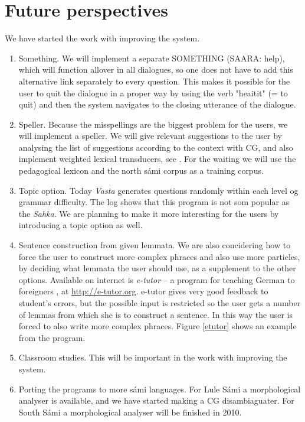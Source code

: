 \documentclass[11pt]{article}
\begin{document}
\section{Future perspectives}
We have started the work with improving the system.
\begin{enumerate}
\item Something. We will implement a separate SOMETHING (SAARA: help), which will function allover in all dialogues, so one does not have to add this alternative link separately to every question. This makes it possible for the user to quit the dialogue in a proper way by using the verb "heaitit" (= to quit) and then the system navigates to the closing utterance of the dialogue. 
\item Speller. Because the misspellings are the biggest problem for the users, we will implement a speller. We will give relevant suggestions to the user by analysing the list of suggestions according to the context with CG, and also implement weighted lexical transducers, see \cite{Linden:09}. For the waiting we will use the pedagogical lexicon and the north sámi corpus as a training corpus.
\item Topic option. Today \textit{Vasta} generates questions randomly within each level og grammar difficulty. The log shows that this program is not som popular as the \textit{Sahka}. We are planning to make it more interesting for the users by introducing a topic option as well.
\item Sentence construction from given lemmata. We are also concidering how to force the user to construct more complex phraces and also use more particles, by deciding what lemmata the user should use, as a supplement to the other options. Available on internet is \textit{e-tutor} -- a program for teaching German to foreigners \cite{Heift:01,Heift:02}, at \url{http://e-tutor.org}. e-tutor gives very good feedback to student's errors, but the possible input is restricted so the user gets a number of lemmas from which she is to construct a sentence. In this way the user is forced to also write more complex phraces. Figure \ref{etutor} shows an example from the program.
\item Classroom studies. This will be important in the work with improving the system.
\item Porting the programs to more sámi languages. For Lule Sámi a morphological analyser is available, and we have started making a CG disambiaguater. For South Sámi a morphological analyser will be finished in 2010. 
  \end{enumerate} 
  \vspace{0.7cm}
\end{document}
